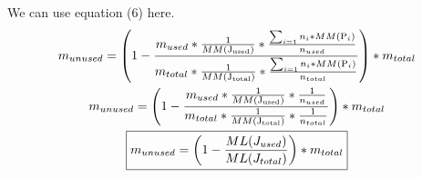 \documentclass[11pt]{article}
\begin{document}
We can use equation (6) here. 
\begin{gather}
    m_{unused}  =   \left(1 - \frac{m_{used} * \frac{1}{MM(\ce{J_{used}})} * \frac{\sum_{i = 1} n_i * MM(\ce{P_i})}{n_{used}}}{m_{total} * \frac{1}{MM(\ce{J_{total}})} * \frac{\sum_{i = 1} n_i * MM(\ce{P_i})}{n_{total}}}\right) * m_{total}\\
    m_{unused}  =   \left(1 - \frac{m_{used} * \frac{1}{MM(\ce{J_{used}})} * \frac{1}{n_{used}}}{m_{total} * \frac{1}{MM(\ce{J_{total}})} * \frac{1}{n_{total}}}\right) * m_{total}\\
    \boxed{m_{unused}  =   \left(1 - \frac{ML(J_{used})}{ML(J_{total})}\right) * m_{total}}
\end{gather}
\end{document}
